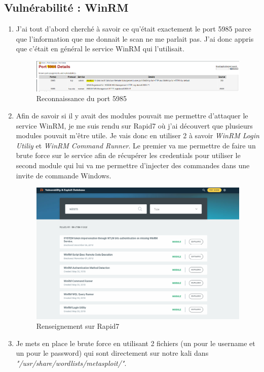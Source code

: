 \documentclass[a4paper]{article}
\begin{document}
\subsection{Vulnérabilité : WinRM}
\begin{enumerate}
  \item J'ai tout d'abord cherché à savoir ce qu'était exactement le port 5985 parce que l'information que me donnait le scan ne me parlait pas. J'ai donc appris que c'était en général le service WinRM
  qui l'utilisait.
  \begin{figure}[H]
    \centering
    \includegraphics[width=14cm]{images/Rapport/kali/W2k8/winrm/1.png}
    \caption{Reconnaissance du port 5985}
  \end{figure}
  \item Afin de savoir si il y avait des modules pouvait me permettre d'attaquer le service WinRM, je me suis rendu sur Rapid7 où j'ai découvert que plusieurs modules pouvait m'être utile. Je vais donc en
  utiliser 2 à savoir \emph{WinRM Login Utiliy} et \emph{WinRM Command Runner}. Le premier va me permettre de faire un brute force sur le service afin de récupérer les credentials pour utiliser le second module
  qui lui va me permettre d'injecter des commandes dans une invite de commande Windows.
  \begin{figure}[H]
    \centering
    \includegraphics[width=13cm]{images/Rapport/kali/W2k8/winrm/2.png}
    \caption{Renseignement sur Rapid7}
  \end{figure}
  \item Je mets en place le brute force en utilisant 2 fichiers (un pour le username et un pour le password) qui sont directement sur notre kali dans \emph{"/usr/share/wordlists/metasploit/"}. 

\end{enumerate}
\end{document}
